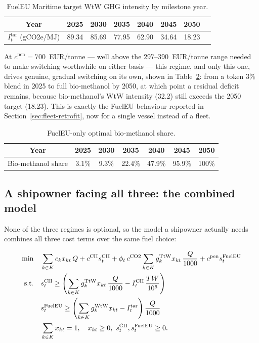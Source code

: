 \begin{table}[htbp]
\centering
\caption{FuelEU Maritime target WtW GHG intensity by milestone year.}
\label{tab:fueleu-target-recap}
\begin{tabular}{@{}cccccccc@{}}
\toprule
Year & 2025 & 2030 & 2035 & 2040 & 2045 & 2050 \\
\midrule
$I_t^{\text{tar}}$ (gCO2e/MJ) & 89.34 & 85.69 & 77.95 & 62.90 & 34.64 & 18.23 \\
\bottomrule
\end{tabular}
\end{table}

At $c^{\text{pen}}=700$~EUR/tonne --- well above the 297--390~EUR/tonne
range needed to make switching worthwhile on either basis --- this
regime, and only this one, drives genuine, gradual switching on its own,
shown in Table~\ref{tab:fueleu-solo-recap}: from a token 3\% blend in
2025 to full bio-methanol by 2050, at which point a residual deficit
remains, because bio-methanol's WtW intensity (32.2) still exceeds the
2050 target (18.23). This is exactly the FuelEU behaviour reported in
Section~\ref{sec:fleet-retrofit}, now for a single vessel instead of a
fleet.

\begin{table}[htbp]
\centering
\caption{FuelEU-only optimal bio-methanol share.}
\label{tab:fueleu-solo-recap}
\begin{tabular}{@{}ccccccc@{}}
\toprule
Year & 2025 & 2030 & 2035 & 2040 & 2045 & 2050 \\
\midrule
Bio-methanol share & 3.1\% & 9.3\% & 22.4\% & 47.9\% & 95.9\% & 100\% \\
\bottomrule
\end{tabular}
\end{table}

\subsection{A shipowner facing all three: the combined model}
\label{sec:regimes-combined}

None of the three regimes is optional, so the model a shipowner actually
needs combines all three cost terms over the same fuel choice:

\begin{align}
  \min \quad & \sum_{k\in K}c_kx_{kt}\,Q
    + c^{\text{CII}}s_t^{\text{CII}}
    + \phi_t\,c^{\text{CO2}}\sum_{k\in K}g_k^{\text{TtW}}x_{kt}\,\frac{Q}{1000}
    + c^{\text{pen}}s_t^{\text{FuelEU}} \notag\\
  \text{s.t.} \quad & s_t^{\text{CII}} \geq \left(\sum_{k\in K}g_k^{\text{TtW}}x_{kt}\,\frac{Q}{1000} - I^{\text{CII}}_t\,\frac{TW}{10^6}\right) \notag\\
  & s_t^{\text{FuelEU}} \geq \left(\sum_{k\in K}g_k^{\text{WtW}}x_{kt} - I_t^{\text{tar}}\right)\frac{Q}{1000} \notag\\
  & \sum_{k\in K}x_{kt}=1, \quad x_{kt}\geq0,\ s_t^{\text{CII}},s_t^{\text{FuelEU}}\geq0. \notag
\end{align}

